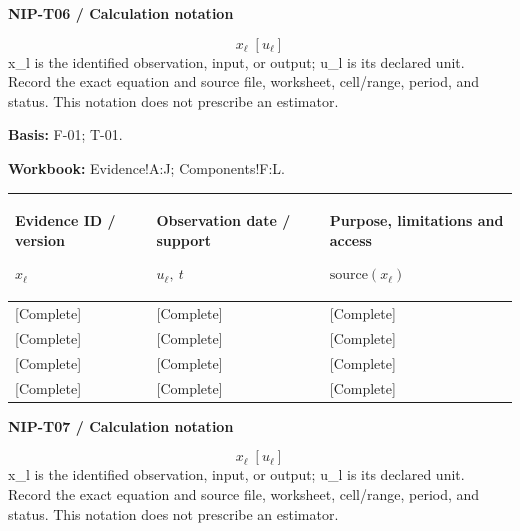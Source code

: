\par\begingroup\sffamily\fontsize{8}{10}\selectfont\color{NEBGreen}\setlength{\parskip}{2pt}\setlength{\abovedisplayskip}{4pt}\setlength{\belowdisplayskip}{4pt}\setlength{\abovedisplayshortskip}{2pt}\setlength{\belowdisplayshortskip}{3pt}
\textbf{NIP-T06 / Calculation notation}\par
{\fontsize{9}{11}\selectfont\[ x_{\ell}\;[u_{\ell}] \]}
x\_l is the identified observation, input, or output; u\_l is its declared unit. Record the exact equation and source file, worksheet, cell/range, period, and status. This notation does not prescribe an estimator.\par
\textbf{Basis:} F-01; T-01.\par
\textbf{Workbook:} Evidence!A:J; Components!F:L.\par\endgroup
{\sffamily\fontsize{8.3}{10.3}\selectfont\begin{longtable}{@{}P{41.24mm} P{47.84mm} P{75.89mm}@{}}
\toprule
\textbf{Evidence ID / version}\par {\normalfont\fontsize{8.2}{10}\selectfont $x_{\ell}$} & \textbf{Observation date / support}\par {\normalfont\fontsize{8.2}{10}\selectfont $u_{\ell},\ t$} & \textbf{Purpose, limitations and access}\par {\normalfont\fontsize{8.2}{10}\selectfont $\text{source}(x_{\ell})$}\\\midrule\endhead
\rule{0pt}{7.7mm}[Complete] & [Complete] & [Complete]\\\hline
\rule{0pt}{7.7mm}[Complete] & [Complete] & [Complete]\\\hline
\rule{0pt}{7.7mm}[Complete] & [Complete] & [Complete]\\\hline
\rule{0pt}{7.7mm}[Complete] & [Complete] & [Complete]\\\hline
\end{longtable}}
\par\begingroup\sffamily\fontsize{8}{10}\selectfont\color{NEBGreen}\setlength{\parskip}{2pt}\setlength{\abovedisplayskip}{4pt}\setlength{\belowdisplayskip}{4pt}\setlength{\abovedisplayshortskip}{2pt}\setlength{\belowdisplayshortskip}{3pt}
\textbf{NIP-T07 / Calculation notation}\par
{\fontsize{9}{11}\selectfont\[ x_{\ell}\;[u_{\ell}] \]}
x\_l is the identified observation, input, or output; u\_l is its declared unit. Record the exact equation and source file, worksheet, cell/range, period, and status. This notation does not prescribe an estimator.\par
